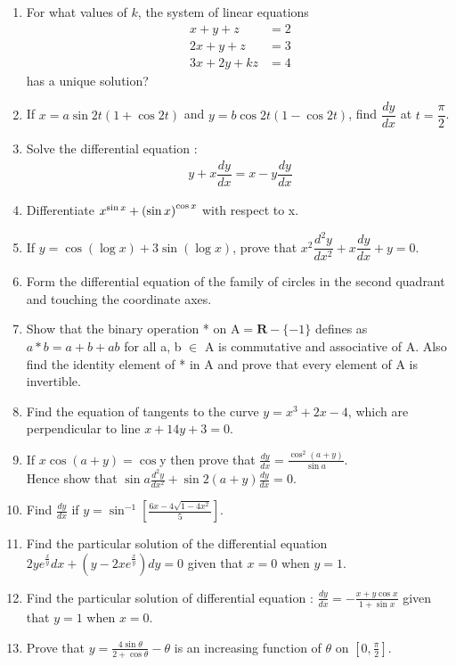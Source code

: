 \begin{enumerate}
    \item For what values of $k$, the system of linear equations
          \begin{align*}
              x+y+z    & = 2 \\
              2x+y+z   & = 3 \\
              3x+2y+kz & = 4
          \end{align*}
          has a unique solution?
    \item If $x = a \sin 2t (1+\cos 2t)$ and $y = b \cos 2t(1-\cos 2t)$, find $\dfrac{dy}{dx}$ at $t = \dfrac{\pi}{2}$.
    \item Solve the differential equation :
          \begin{align*}
              y+ x\dfrac{dy}{dx} = x- y\dfrac{dy}{dx}
          \end{align*}
    \item Differentiate $x^{\sin x} + \left(\sin x\right)^{\cos x}$ with respect to x.
    \item If $y=\cos(\log x)+3\sin(\log x)$, prove that ${x}^2\dfrac{d^2y}{dx^2} + x\dfrac{dy}{dx}+{y}=0$.
    \item Form the differential equation of the family of circles in the second quadrant and touching the coordinate axes.
    \item Show that the binary operation * on $\mathrm{A} = \textbf{R} - \{-1\}$ defines as $a*b = a+b+ab$ for all a, b $\in$ A is commutative and associative of A. Also find the identity element of * in A and prove that every element of A is invertible.
    \item Find the equation of tangents to the curve $y=x^3+2x-4$, which are perpendicular to line $x+14y+3=0$.
    \item If $x\cos(a+y) = \cos$y then prove that $\frac{dy}{dx}=\frac{\cos^2(a+y)}{\sin a}$.\\
          Hence show that $\sin a\frac{d^2y}{dx^2}+\sin 2(a+y)\frac{dy}{dx}=0$.
    \item Find $\frac{dy}{dx}$ if $y=\sin^{-1}[\frac{6x-4\sqrt{1-4x^2}}{5}]$.
    \item Find the particular solution of the differential equation \\$2y e^{\frac{x}{y}} dx+(y-2x e^{\frac{x}{y}})dy=0$ given that $x=0$ when $y=1$.
    \item Find the particular solution of differential equation : $\frac{dy}{dx}=-\frac{x+y\cos x}{1+\sin x}$ given that $y=1$ when $x=0$.
    \item Prove that $y=\frac{4\sin \theta}{2+\cos \theta}-\theta$ is an increasing function of $\theta$ on $[0,\frac{\pi}{2}]$.

\end{enumerate}
